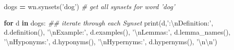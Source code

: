 \documentclass[
]{book}
\newenvironment{Shaded}{\begin{snugshade}}{\end{snugshade}}
\newcommand{\BuiltInTok}[1]{#1}
\newcommand{\CharTok}[1]{\textcolor[rgb]{0.5,0.5,0.5}{#1}}
\newcommand{\CommentTok}[1]{\textcolor[rgb]{0.37,0.37,0.37}{\textit{#1}}}
\newcommand{\ControlFlowTok}[1]{\textcolor[rgb]{0.27,0.27,0.27}{\textbf{#1}}}
\newcommand{\KeywordTok}[1]{\textcolor[rgb]{0.27,0.27,0.27}{\textbf{#1}}}
\newcommand{\NormalTok}[1]{#1}
\newcommand{\OperatorTok}[1]{\textcolor[rgb]{0.43,0.43,0.43}{\textbf{#1}}}
\newcommand{\StringTok}[1]{\textcolor[rgb]{0.5,0.5,0.5}{#1}}
\begin{document}
\begin{Shaded}
\begin{Highlighting}[]
\NormalTok{dogs }\OperatorTok{=}\NormalTok{ wn.synsets(}\StringTok{'dog'}\NormalTok{) }\CommentTok{# get all synsets for word 'dog'}

\ControlFlowTok{for}\NormalTok{ d }\KeywordTok{in}\NormalTok{ dogs:  }\CommentTok{## iterate through each Synset}
  \BuiltInTok{print}\NormalTok{(d,}\StringTok{':}\CharTok{\textbackslash{}n}\StringTok{Definition:'}\NormalTok{, d.definition(),}
           \StringTok{'}\CharTok{\textbackslash{}n}\StringTok{Example:'}\NormalTok{,    d.examples(),}
           \StringTok{'}\CharTok{\textbackslash{}n}\StringTok{Lemmas:'}\NormalTok{,     d.lemma_names(),}
           \StringTok{'}\CharTok{\textbackslash{}n}\StringTok{Hyponyms:'}\NormalTok{,   d.hyponyms(), }
           \StringTok{'}\CharTok{\textbackslash{}n}\StringTok{Hypernyms:'}\NormalTok{,  d.hypernyms(), }\StringTok{'}\CharTok{\textbackslash{}n\textbackslash{}n}\StringTok{'}\NormalTok{)}
\end{Highlighting}
\end{Shaded}
\end{document}
